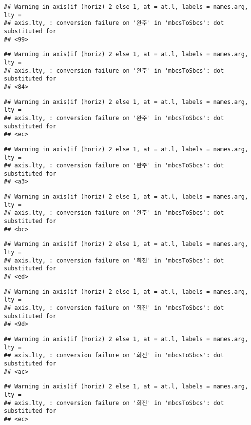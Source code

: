 \documentclass[
]{article}
\begin{document}
\begin{verbatim}
## Warning in axis(if (horiz) 2 else 1, at = at.l, labels = names.arg, lty =
## axis.lty, : conversion failure on '완주' in 'mbcsToSbcs': dot substituted for
## <99>
\end{verbatim}

\begin{verbatim}
## Warning in axis(if (horiz) 2 else 1, at = at.l, labels = names.arg, lty =
## axis.lty, : conversion failure on '완주' in 'mbcsToSbcs': dot substituted for
## <84>
\end{verbatim}

\begin{verbatim}
## Warning in axis(if (horiz) 2 else 1, at = at.l, labels = names.arg, lty =
## axis.lty, : conversion failure on '완주' in 'mbcsToSbcs': dot substituted for
## <ec>
\end{verbatim}

\begin{verbatim}
## Warning in axis(if (horiz) 2 else 1, at = at.l, labels = names.arg, lty =
## axis.lty, : conversion failure on '완주' in 'mbcsToSbcs': dot substituted for
## <a3>
\end{verbatim}

\begin{verbatim}
## Warning in axis(if (horiz) 2 else 1, at = at.l, labels = names.arg, lty =
## axis.lty, : conversion failure on '완주' in 'mbcsToSbcs': dot substituted for
## <bc>
\end{verbatim}

\begin{verbatim}
## Warning in axis(if (horiz) 2 else 1, at = at.l, labels = names.arg, lty =
## axis.lty, : conversion failure on '희진' in 'mbcsToSbcs': dot substituted for
## <ed>
\end{verbatim}

\begin{verbatim}
## Warning in axis(if (horiz) 2 else 1, at = at.l, labels = names.arg, lty =
## axis.lty, : conversion failure on '희진' in 'mbcsToSbcs': dot substituted for
## <9d>
\end{verbatim}

\begin{verbatim}
## Warning in axis(if (horiz) 2 else 1, at = at.l, labels = names.arg, lty =
## axis.lty, : conversion failure on '희진' in 'mbcsToSbcs': dot substituted for
## <ac>
\end{verbatim}

\begin{verbatim}
## Warning in axis(if (horiz) 2 else 1, at = at.l, labels = names.arg, lty =
## axis.lty, : conversion failure on '희진' in 'mbcsToSbcs': dot substituted for
## <ec>
\end{verbatim}
\end{document}
